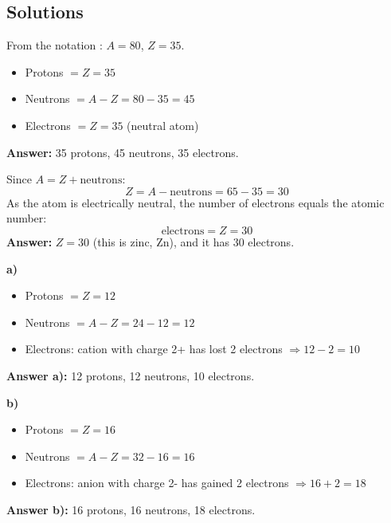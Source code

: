 \documentclass[11pt,a4paper]{article}
\begin{document}

\subsection*{Solutions}

\begin{solucioneng}
From the notation : $A = 80$, $Z = 35$.
\begin{itemize}
    \item Protons $= Z = 35$
    \item Neutrons $= A - Z = 80 - 35 = 45$
    \item Electrons $= Z = 35$ (neutral atom)
\end{itemize}
\textbf{Answer:} 35 protons, 45 neutrons, 35 electrons.
\end{solucioneng}

\begin{solucioneng}
Since $A = Z + \text{neutrons}$:
\[
Z = A - \text{neutrons} = 65 - 35 = 30
\]
As the atom is electrically neutral, the number of electrons equals the atomic number:
\[
\text{electrons} = Z = 30
\]
\textbf{Answer:} $Z = 30$ (this is zinc, Zn), and it has 30 electrons.
\end{solucioneng}

\begin{solucioneng}
\textbf{a) }
\begin{itemize}
    \item Protons $= Z = 12$
    \item Neutrons $= A - Z = 24 - 12 = 12$
    \item Electrons: cation with charge 2+ has lost 2 electrons $\Rightarrow 12 - 2 = 10$
\end{itemize}
\textbf{Answer a):} 12 protons, 12 neutrons, 10 electrons.

\textbf{b) }
\begin{itemize}
    \item Protons $= Z = 16$
    \item Neutrons $= A - Z = 32 - 16 = 16$
    \item Electrons: anion with charge 2- has gained 2 electrons $\Rightarrow 16 + 2 = 18$
\end{itemize}
\textbf{Answer b):} 16 protons, 16 neutrons, 18 electrons.
\end{solucioneng}
\end{document}
